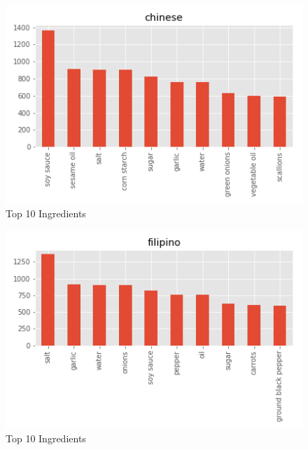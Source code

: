 \documentclass[sigconf]{acmart}
\begin{document}
\begin{figure}[!ht]
  \centering\includegraphics[width=\columnwidth]{images/chinese_10_most_used_ingredients.png}
  \caption{Top 10 Ingredients }\label{f:chinese_10_most_used_ingredients}
\end{figure}

\begin{figure}[!ht]
  \centering\includegraphics[width=\columnwidth]{images/filipino_10_most_used_ingredients.png}
  \caption{Top 10 Ingredients }\label{f:filipino_10_most_used_ingredients}
\end{figure}
\end{document}
